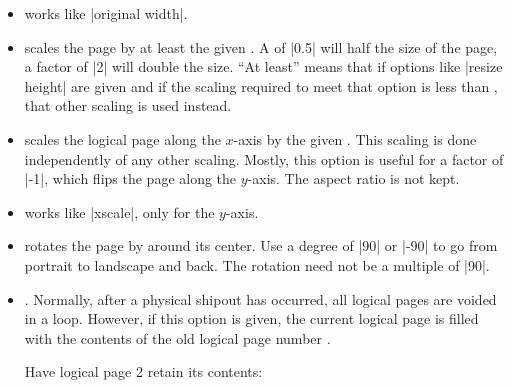 \begin{command}{\pgfpageslogicalpageoptions{}}
\begin{itemize}
            You need this option only for special logical pages that have a
            height or width different from the normal one and for which you
            will (later on) set these sizes yourself.
        \item {} works like
            |original width|.
        \item {} scales the page by at least the
            given . A  of |0.5| will half the size of
            the page, a factor of |2| will double the size. ``At least'' means
            that if options like |resize height| are given and if the scaling
            required to meet that option is less than , that other
            scaling is used instead.
        \item {} scales the logical page along
            the $x$-axis by the given . This scaling is done
            independently of any other scaling. Mostly, this option is useful
            for a factor of |-1|, which flips the page along the $y$-axis. The
            aspect ratio is not kept.
        \item {} works like |xscale|, only for
            the $y$-axis.
        \item {} rotates the page by
             around its center. Use a degree of |90| or |-90| to
            go from portrait to landscape and back. The rotation need not be a
            multiple of |90|.
        \item {}. Normally, after
            a physical shipout has occurred, all logical pages are voided in a
            loop. However, if this option is given, the current logical page is
            filled with the contents of the old logical page number
            .

            \example Have logical page 2 retain its contents:
\begin{codeexample}
\end{codeexample}


\end{itemize}
\end{command}

